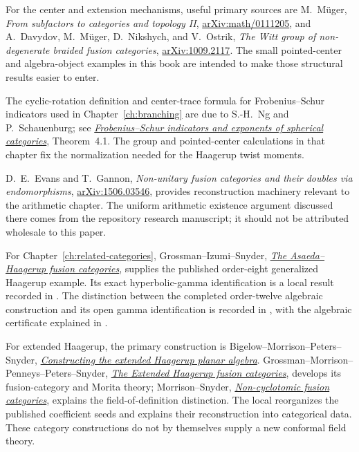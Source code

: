 For the center and extension mechanisms, useful primary sources are
M.~M\"uger,
\emph{From subfactors to categories and topology II},
\href{https://arxiv.org/abs/math/0111205}{arXiv:math/0111205},
and A.~Davydov, M.~M\"uger, D.~Nikshych, and V.~Ostrik,
\emph{The Witt group of non-degenerate braided fusion categories},
\href{https://arxiv.org/abs/1009.2117}{arXiv:1009.2117}.
The small pointed-center and algebra-object examples in this book
are intended to make those structural results easier to enter.

The cyclic-rotation definition and center-trace formula for
Frobenius--Schur indicators used in Chapter~\ref{ch:branching}
are due to S.-H.~Ng and P.~Schauenburg; see
\href{https://arxiv.org/abs/math/0601012}{\emph{Frobenius--Schur
indicators and exponents of spherical categories}}, Theorem~4.1.
The group and pointed-center calculations in that chapter fix
the normalization needed for the Haagerup twist moments.

D.~E.~Evans and T.~Gannon,
\emph{Non-unitary fusion categories and their doubles via
endomorphisms},
\href{https://arxiv.org/abs/1506.03546}{arXiv:1506.03546},
provides reconstruction machinery relevant to the arithmetic
chapter. The uniform arithmetic existence argument discussed there
comes from the repository research manuscript; it should not be
attributed wholesale to this paper.

For Chapter~\ref{ch:related-categories}, Grossman--Izumi--Snyder,
\href{https://arxiv.org/abs/1501.07324}{\emph{The Asaeda--Haagerup
fusion categories}}, supplies the published order-eight generalized
Haagerup example. Its exact hyperbolic-gamma identification is a local
result recorded in .
The distinction between the completed order-twelve algebraic
construction and its open gamma identification is recorded in
, with the
algebraic certificate explained in
.

For extended Haagerup, the primary construction is
Bigelow--Morrison--Peters--Snyder,
\href{https://arxiv.org/abs/0909.4099}{\emph{Constructing the extended
Haagerup planar algebra}}. Grossman--Morrison--Penneys--Peters--Snyder,
\href{https://arxiv.org/abs/1810.06076}{\emph{The Extended Haagerup
fusion categories}}, develops its fusion-category and Morita theory;
Morrison--Snyder,
\href{https://arxiv.org/abs/1002.0168}{\emph{Non-cyclotomic fusion
categories}}, explains the field-of-definition distinction. The local
reorganizes the published coefficient seeds and explains their
reconstruction into categorical data. These category constructions
do not by themselves supply a new conformal field theory.

